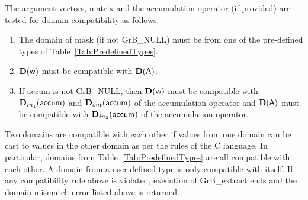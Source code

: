 The argument vectors, matrix and the accumulation 
operator (if provided) are tested for domain compatibility as follows:
\begin{enumerate}
	\item The domain of {\sf mask} (if not {\sf GrB\_NULL}) must be from one of 
    the pre-defined types of Table~\ref{Tab:PredefinedTypes}.

	\item $\bold{D}({\sf w})$ must be 
    compatible with $\bold{D}({\sf A})$.

	\item If {\sf accum} is not {\sf GrB\_NULL}, then $\bold{D}({\sf w})$ must be
    compatible with $\mbox{$\mathbf{D}_{in_{1}}$}({\sf accum})$ and $\mbox{$\mathbf{D}_{out}$}({\sf accum})$ of the accumulation operator and 
    $\bold{D}({\sf A})$ must be compatible with $\mbox{$\mathbf{D}_{in_{2}}$}({\sf accum})$ of the accumulation operator.
\end{enumerate}
Two domains are compatible with each other if values from one domain can be cast 
to values in the other domain as per the rules of the C language.
In particular, domains from Table~\ref{Tab:PredefinedTypes} are all compatible 
with each other. A domain from a user-defined type is only compatible with itself.
If any compatibility rule above is violated, execution of {\sf GrB\_extract} ends and 
the domain mismatch error listed above is returned.


